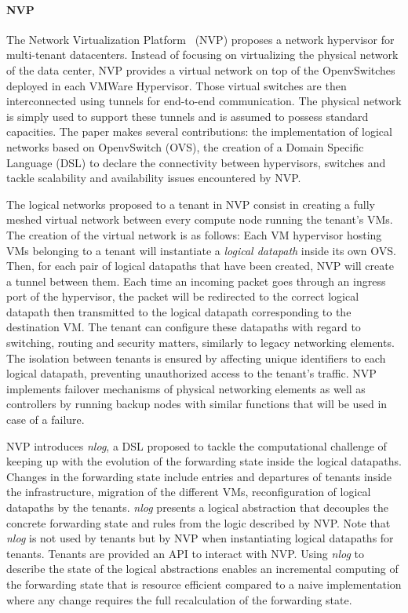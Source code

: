 \paragraph{NVP}
The Network Virtualization Platform~\cite{NVP-Koponen2014} (NVP) proposes a network hypervisor for multi-tenant datacenters. Instead of focusing on virtualizing the physical network of the data center, NVP provides a virtual network on top of the OpenvSwitches~\cite{openvswitch} deployed in each VMWare Hypervisor. Those virtual switches are then interconnected using tunnels for end-to-end communication. 
The physical network is simply used to support these tunnels and is assumed to possess standard capacities.
The paper makes several contributions: the implementation of logical networks based on OpenvSwitch (OVS), the creation of a Domain Specific Language (DSL) to declare the connectivity between hypervisors, switches \etc and tackle scalability and availability issues encountered by NVP.

The logical networks proposed to a tenant in NVP consist in creating a fully meshed virtual network between every compute node running the tenant's VMs.
The creation of the virtual network is as follows:
Each VM hypervisor hosting VMs belonging to a tenant will instantiate a \textit{logical datapath} inside its own OVS. 
Then, for each pair of logical datapaths that have been created, NVP will create a tunnel between them.
Each time an incoming packet goes through an ingress port of the hypervisor, the packet will be redirected to the correct logical datapath then transmitted to the logical datapath corresponding to the destination VM.
The tenant can configure these datapaths with regard to switching, routing and security matters, similarly to legacy networking elements.
The isolation between tenants is ensured by affecting unique identifiers to each logical datapath, preventing unauthorized access to the tenant's traffic.
NVP implements failover mechanisms of physical networking elements as well as controllers by running backup nodes with similar functions that will be used in case of a failure.

NVP introduces \textit{nlog}, a DSL proposed to tackle the computational challenge of keeping up with the evolution of the forwarding state inside the logical datapaths. Changes in the forwarding state include entries and departures of tenants inside the infrastructure, migration of the different VMs, reconfiguration of logical datapaths by the tenants. \textit{nlog} presents a logical abstraction that decouples the concrete forwarding state and rules from the logic described by NVP. Note that \textit{nlog} is not used by tenants but by NVP when instantiating logical datapaths for tenants.
Tenants are provided an API to interact with NVP.
Using \textit{nlog} to describe the state of the logical abstractions enables an incremental computing of the forwarding state that is resource efficient compared to a naive implementation where any change requires the full recalculation of the forwarding state.

